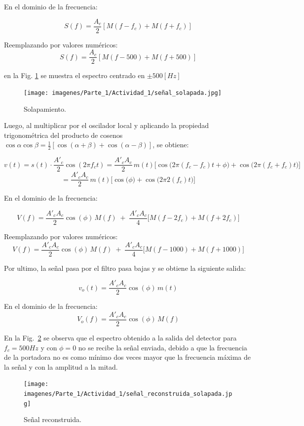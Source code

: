 En el dominio de la frecuencia:

\[
S(f) = \frac{A_c}{2} \left[ M(f-f_c) + M(f+f_c) \right]
\]

Reemplazando por valores numéricos:
\[
S(f) = \frac{A_c}{2} \left[ M(f-500) + M(f+500) \right]
\]

en la Fig. \ref{fig:1a_solapamiento} se muestra el espectro centrado en $\pm 500 [Hz]$

    \begin{figure}[H]
        \centering
        \texttt{[image: imagenes/Parte\_1/Actividad\_1/señal\_solapada.jpg]}
        \caption{Solapamiento.}
        \label{fig:1a_solapamiento}
    \end{figure}
    
Luego, al multiplicar por el oscilador local y aplicando la propiedad trigonométrica del producto de cosenos $\cos\alpha \cos\beta = \tfrac{1}{2}\left[\cos(\alpha+\beta)+\cos(\alpha-\beta)\right]$, se obtiene:

\[
v(t) = s(t) \cdot \frac{A'_c}{2} \cos(2\pi f_c t) =  \frac{A'_c A_c}{2} \, m(t) \Big[ \cos\big(2\pi(f_c-f_c)t + \phi \big)  + \cos\big(2\pi(f_c+f_c)t\big) \Big]
\]
\[
 = \frac{A'_c A_c}{2} \, m(t) \Big[\cos\big(\phi \big)  + \cos\big(2\pi2(f_c)t\big) \Big] 
\]

En el dominio de la frecuencia:

\[
V(f) = \frac{A'_c A_c}{2}\cos(\phi)\, M(f) \;+\; \frac{A'_c A_c}{4}\Big[ M(f-2f_c) + M(f+2f_c) \Big]
\]

Reemplazando por valores numéricos: 
\[
V(f) = \frac{A'_c A_c}{2}\cos(\phi)\, M(f) \;+\; \frac{A'_c A_c}{4}\Big[ M(f-1000) + M(f+1000) \Big]
\]

Por ultimo, la señal pasa por el filtro pasa bajas y se obtiene la siguiente salida:

\[
v_o(t) = \frac{A'_c A_c}{2}\cos(\phi)\, m(t) 
\]

En el dominio de la frecuencia:
\[
V_o(f) = \frac{A'_c A_c}{2}\cos(\phi)\, M(f) 
\]

En la  Fig.~\ref{fig:señal_reconstruida_solapada} se observa que el espectro obtenido a la salida del detector para $f_c=500 Hz$ y con $\phi = 0$ no se recibe la señal enviada, debido a que la frecuencia de la portadora no es como mínimo dos veces mayor que la frecuencia máxima de la señal y con la amplitud a la mitad.

\begin{figure}
    \centering
    \texttt{[image: imagenes/Parte\_1/Actividad\_1/señal\_reconstruida\_solapada.jpg]}
    \caption{Señal reconstruida.}
    \label{fig:señal_reconstruida_solapada}
\end{figure}
    
